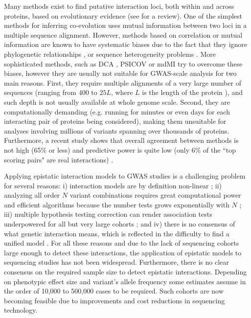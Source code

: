 Many methods exist to find putative interaction loci, both within and across proteins, based on evolutionary evidence (see \cite{de2013emerging} for a review). One of the simplest methods for inferring co-evolution uses mutual information between two loci \cite{marks2012protein} in a multiple sequence alignment. However, methods based on correlation or mutual information are known to have systematic biases due to the fact that they ignore phylogenetic relationships \cite{de2013emerging}, or sequence heterogeneity problems \cite{weigt2009identification}. More sophisticated methods, such as DCA \cite{morcos2011direct}, PSICOV \cite{jones2012psicov} or mdMI \cite{clark2014multidimensional} try to overcome these biases, however they are usually not suitable for GWAS-scale analysis for two main reasons. First, they require multiple alignments of a very large number of sequences (ranging from $400$ to $25L$, where $L$ is the length of the protein \cite{clark2014multidimensional}), and such depth is not usually available at whole genome scale. Second, they are computationally demanding (e.g. running for minutes or even days for each interacting pair of proteins being considered), making them unsuitable for analyses involving millions of variants spanning over thousands of proteins. Furthermore, a recent study shows that overall agreement between methods is not high (65\% or less) and predictive power is quite low (only 6\% of the ``top scoring pairs" are real interactions) \cite{clark2014multidimensional}.

Applying epistatic interaction models to GWAS studies is a challenging problem for several reasons: i) interaction models are by definition non-linear \cite{gao2010classification}; ii) analyzing all order $N$ variant combinations requires great computational power and efficient algorithms because the number tests grows exponentially with $N$ \cite{phillips2008epistasis}; iii) multiple hypothesis testing correction can render association tests underpowered for all but very large cohorts \cite{gao2010classification, phillips2008epistasis}; and iv) there is no consensus of what genetic interaction means, which is reflected in the difficulty to find a unified model \cite{phillips2008epistasis,mani2008defining}. For all these reasons and due to the lack of sequencing cohorts large enough to detect these interactions, the application of epistatic models to sequencing studies has not been widespread. Furthermore, there is no clear consensus on the required sample size to detect epistatic interactions. Depending on phenotypic effect size and variant's allele frequency some estimates assume in the order of 10,000 to 500,000 cases \cite{jostins2013using} to be required. Such cohorts are now becoming feasible due to improvements and cost reductions in sequencing technology.


